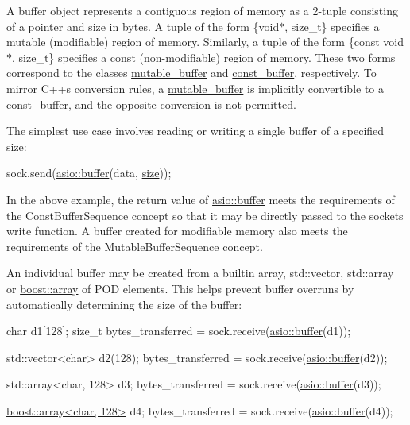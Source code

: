 A buffer object represents a contiguous region of memory as a 2-\/tuple consisting of a pointer and size in bytes. A tuple of the form {\ttfamily \{void$\ast$, size\+\_\+t\}} specifies a mutable (modifiable) region of memory. Similarly, a tuple of the form {\ttfamily \{const void$\ast$, size\+\_\+t\}} specifies a const (non-\/modifiable) region of memory. These two forms correspond to the classes \hyperlink{classasio_1_1mutable__buffer}{mutable\+\_\+buffer} and \hyperlink{classasio_1_1const__buffer}{const\+\_\+buffer}, respectively. To mirror C++\textquotesingle{}s conversion rules, a \hyperlink{classasio_1_1mutable__buffer}{mutable\+\_\+buffer} is implicitly convertible to a \hyperlink{classasio_1_1const__buffer}{const\+\_\+buffer}, and the opposite conversion is not permitted.

The simplest use case involves reading or writing a single buffer of a specified size\+:


\begin{DoxyCode}
sock.send(\hyperlink{group__buffer_ga1ed66e401559cbfd19595392f653b47c}{asio::buffer}(data, \hyperlink{namespaceuva_1_1utils_1_1containers_aea6a0a858974dd7edb4227dcbcbc1eb6a0be5bdf7cf8c7c58d0bc5678caa07791}{size})); 
\end{DoxyCode}


In the above example, the return value of \hyperlink{group__buffer_ga1ed66e401559cbfd19595392f653b47c}{asio\+::buffer} meets the requirements of the Const\+Buffer\+Sequence concept so that it may be directly passed to the socket\textquotesingle{}s write function. A buffer created for modifiable memory also meets the requirements of the Mutable\+Buffer\+Sequence concept.

An individual buffer may be created from a builtin array, std\+::vector, std\+::array or \hyperlink{classboost_1_1array}{boost\+::array} of P\+O\+D elements. This helps prevent buffer overruns by automatically determining the size of the buffer\+:


\begin{DoxyCode}
 \textcolor{keywordtype}{char} d1[128];
\textcolor{keywordtype}{size\_t} bytes\_transferred = sock.receive(\hyperlink{group__buffer_ga1ed66e401559cbfd19595392f653b47c}{asio::buffer}(d1));

std::vector<char> d2(128);
bytes\_transferred = sock.receive(\hyperlink{group__buffer_ga1ed66e401559cbfd19595392f653b47c}{asio::buffer}(d2));

std::array<char, 128> d3;
bytes\_transferred = sock.receive(\hyperlink{group__buffer_ga1ed66e401559cbfd19595392f653b47c}{asio::buffer}(d3));

\hyperlink{classboost_1_1array}{boost::array<char, 128>} d4;
bytes\_transferred = sock.receive(\hyperlink{group__buffer_ga1ed66e401559cbfd19595392f653b47c}{asio::buffer}(d4)); 
\end{DoxyCode}


